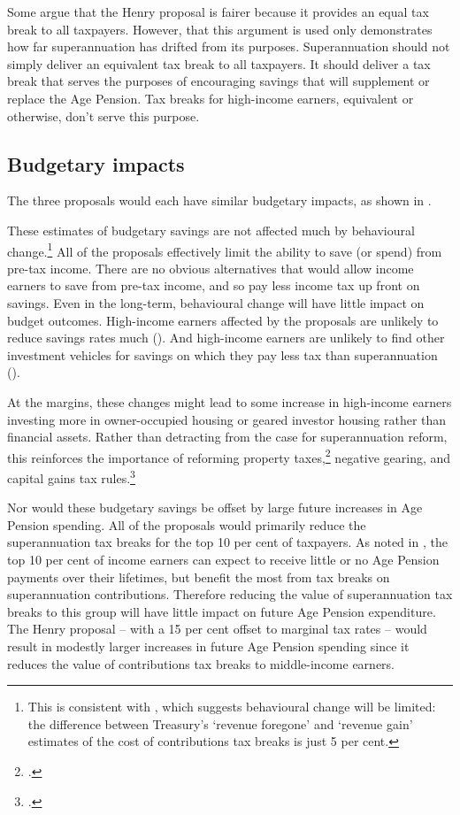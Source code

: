 Some argue that the Henry proposal is fairer because it provides an equal tax break to all taxpayers. However, that this argument is used only demonstrates how far superannuation has drifted from its purposes. Superannuation should not simply deliver an equivalent tax break to all taxpayers. It should deliver a tax break that serves the purposes of encouraging savings that will supplement or replace the Age Pension. Tax breaks for high-income earners, equivalent or otherwise, don’t serve this purpose.

\subsection{Budgetary impacts}
The three proposals would each have similar budgetary impacts, as shown in .%
\enlargethispage*{0.5\baselineskip}\enlargethispage{0.5\baselineskip}

These estimates of budgetary savings are not affected much by behavioural change.\footnote{This is consistent with \textcite{Treasury2015TES2014}, which suggests behavioural change will be limited: the difference between Treasury’s ‘revenue foregone’ and ‘revenue gain’ estimates of the cost of contributions tax breaks is just 5 per cent.}  All of the proposals effectively limit the ability to save (or spend) from pre-tax income. There are no obvious alternatives that would allow income earners to save from pre-tax income, and so pay less income tax up front on savings. Even in the long-term, behavioural change will have little impact on budget outcomes. High-income earners affected by the proposals are unlikely to reduce savings rates much (). And high-income earners are unlikely to find other investment vehicles for savings on which they pay less tax than superannuation (). 

\begin{samepage}
At the margins, these changes might lead to some increase in high-income earners investing more in owner-occupied housing or geared investor housing rather than financial assets. Rather than detracting from the case for superannuation reform, this reinforces the importance of reforming property taxes,\footcite{DaleyCoates2015PropertyTaxes}  negative gearing, and capital gains tax rules.\footnote{\textcites{DaleyMcGannonSavage2013BudgetPressures}{DaleyWood2016NG}.}
\end{samepage}


Nor would these budgetary savings be offset by large future increases in Age Pension spending. All of the proposals would primarily reduce the superannuation tax breaks for the top 10 per cent of taxpayers. As noted in , the top 10 per cent of income earners can expect to receive little or no Age Pension payments over their lifetimes, but benefit the most from tax breaks on superannuation contributions. Therefore reducing the value of superannuation tax breaks to this group will have little impact on future Age Pension expenditure. The Henry proposal – with a 15 per cent offset to marginal tax rates – would result in modestly larger increases in future Age Pension spending since it reduces the value of contributions tax breaks to middle-income earners.

